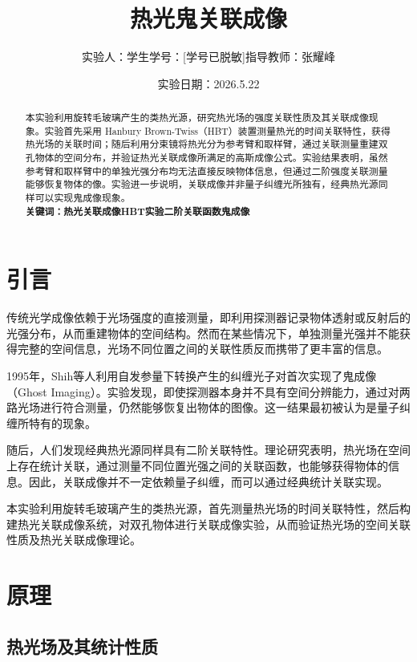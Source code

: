 \documentclass[a4paper]{ctexart}
\title{热光鬼关联成像}
\author{实验人：学生\qquad 学号：[学号已脱敏]\qquad 指导教师：张耀峰}
\date{实验日期：2026.5.22}
\begin{document}
    
    \maketitle
    
\begin{abstract}

本实验利用旋转毛玻璃产生的类热光源，研究热光场的强度关联性质及其关联成像现象。实验首先采用 Hanbury Brown-Twiss（HBT）装置测量热光的时间关联特性，获得热光场的关联时间；随后利用分束镜将热光分为参考臂和取样臂，通过关联测量重建双孔物体的空间分布，并验证热光关联成像所满足的高斯成像公式。实验结果表明，虽然参考臂和取样臂中的单独光强分布均无法直接反映物体信息，但通过二阶强度关联测量能够恢复物体的像。实验进一步说明，关联成像并非量子纠缠光所独有，经典热光源同样可以实现鬼成像现象。\\

\textbf{关键词：热光关联成像\quad HBT实验\quad 二阶关联函数\quad 鬼成像}

\end{abstract}
    
\section{引言}

传统光学成像依赖于光场强度的直接测量，即利用探测器记录物体透射或反射后的光强分布，从而重建物体的空间结构。然而在某些情况下，单独测量光强并不能获得完整的空间信息，光场不同位置之间的关联性质反而携带了更丰富的信息。

1995年，Shih等人利用自发参量下转换产生的纠缠光子对首次实现了鬼成像（Ghost Imaging）。实验发现，即使探测器本身并不具有空间分辨能力，通过对两路光场进行符合测量，仍然能够恢复出物体的图像。这一结果最初被认为是量子纠缠所特有的现象。

随后，人们发现经典热光源同样具有二阶关联特性。理论研究表明，热光场在空间上存在统计关联，通过测量不同位置光强之间的关联函数，也能够获得物体的信息。因此，关联成像并不一定依赖量子纠缠，而可以通过经典统计关联实现。

本实验利用旋转毛玻璃产生的类热光源，首先测量热光场的时间关联特性，然后构建热光关联成像系统，对双孔物体进行关联成像实验，从而验证热光场的空间关联性质及热光关联成像理论。

\section{原理}
\subsection{热光场及其统计性质}
\end{document}
